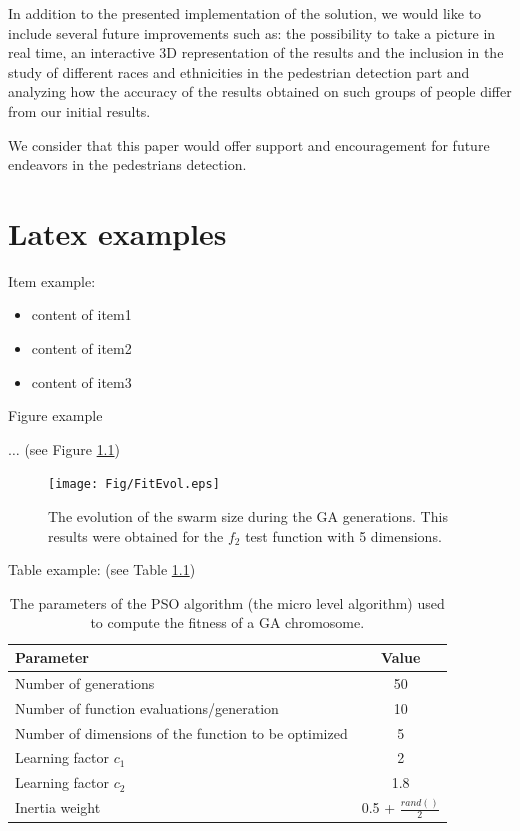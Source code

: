 \documentclass[runningheads,a4paper,11pt]{report}
\begin{document}
In addition to the presented implementation of the solution, we would like to include several future improvements such as: the possibility to take a picture in real time, an interactive 3D representation of the results and the
inclusion in the study of different races and ethnicities in the pedestrian detection part and analyzing how the accuracy of the results obtained on such groups of people differ from our initial results.

We consider that this paper would offer support and encouragement for future endeavors in the pedestrians detection.



\chapter{Latex examples}

Item example: 

\begin{itemize}
	\item content of item1
 	\item content of item2
 	\item content of item3
\end{itemize}



Figure example 

$\ldots$ (see Figure \ref{swarmsize})

\begin{figure}[htbp]
	\centerline{\texttt{[image: Fig/FitEvol.eps]}}  
	\caption{The evolution of the swarm size during the GA generations. This results were obtained for the $f_2$ test function with 5 dimensions.}
	\label{swarmsize}
\end{figure}


Table example: (see Table \ref{tab3PSO})


\begin{table}[htbp]
	\caption{The parameters of the PSO algorithm (the micro level algorithm) used to compute the fitness of a GA chromosome.}
	\label{tab3PSO}
		\begin{center}
			\begin{tabular}{p{220pt}c}

				\textbf{Parameter}& \textbf{Value} \\
				\hline\hline
 				Number of generations& 50 \\
 				Number of function evaluations/generation& 10 \\
 				Number of dimensions of the function to be optimized& 5 \\
 				Learning factor $c_{1}$& 2 \\
 				Learning factor $c_{2}$ & 1.8\\
 				Inertia weight& 0.5 + $\frac{rand()}{2}$\\
		
			\end{tabular}
		\end{center}
\end{table}
\end{document}
